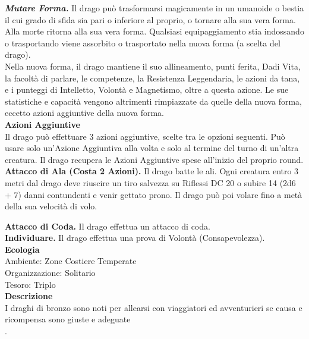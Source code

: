 \begin{multicols}{2}
\emph{\textbf{Mutare Forma.}} Il drago può trasformarsi magicamente in un umanoide o bestia il cui grado di sfida sia pari o inferiore al proprio, o tornare alla sua vera forma. Alla morte ritorna alla sua vera forma. Qualsiasi equipaggiamento stia indossando o trasportando viene assorbito o trasportato nella nuova forma (a scelta del drago). \\
Nella nuova forma, il drago mantiene il suo allineamento, punti ferita, Dadi Vita, la facoltà di parlare, le competenze, la Resistenza Leggendaria, le azioni da tana, e i punteggi di Intelletto, Volontà e Magnetismo, oltre a questa azione. Le sue statistiche e capacità vengono altrimenti rimpiazzate da quelle della nuova forma, eccetto azioni aggiuntive della nuova forma.\\
\textbf{Azioni Aggiuntive}\\
Il drago può effettuare 3 azioni aggiuntive, scelte tra le opzioni seguenti. Può usare solo un'Azione Aggiuntiva alla volta e solo al termine del turno di un'altra creatura. Il drago recupera le Azioni Aggiuntive spese all'inizio del proprio round.\\

\textbf{Attacco di Ala (Costa 2 Azioni).} Il drago batte le ali. Ogni creatura entro 3 metri dal drago deve riuscire un tiro salvezza su Riflessi DC 20 o subire 14 (2d6 + 7) danni contundenti e venir gettato prono. Il drago può poi volare fino a metà della sua velocità di volo.

\textbf{Attacco di Coda.} Il drago effettua un attacco di coda.\\
\textbf{Individuare.} Il drago effettua una prova di Volontà (Consapevolezza).\\
\textbf{Ecologia}\\
Ambiente: Zone Costiere Temperate\\
Organizzazione: Solitario\\
Tesoro: Triplo\\
\textbf{Descrizione}\\
I draghi di bronzo sono noti per allearsi con viaggiatori ed avventurieri se causa e ricompensa sono giuste e adeguate\\
.


\end{multicols}
